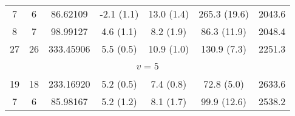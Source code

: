 \begin{table*}[htp]
\begin{tabular}{ccccccc}
 7 & 6 & 86.62109 & -2.1 (1.1) & 13.0 (1.4) & 265.3 (19.6) & 2043.6 \\
 8 & 7 & 98.99127 & 4.6 (1.1) & 8.2 (1.9) & 86.3 (11.9) & 2048.4 \\
 27 & 26 & 333.45906 & 5.5 (0.5) & 10.9 (1.0) & 130.9 (7.3) & 2251.3 \\
&\vspace{-0.75em}\\
\multicolumn{7}{c}{$v = 5$} \\
\vspace{-0.75em}\\
 19 & 18 & 233.16920 & 5.2 (0.5) & 7.4 (0.8) & 72.8 (5.0) & 2633.6 \\
 7 & 6 & 85.98167 & 5.2 (1.2) & 8.1 (1.7) & 99.9 (12.6) & 2538.2 \\
\hline
\end{tabular}

\par 
\end{table*}
